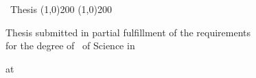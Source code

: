 %
%
%

\makeatletter
\begin{titlepage}

  \vspace*{2cm}
  \center \Large \studylevel\ Thesis
  \center \line(1,0){200}
  \vspace{0.1cm}
  \makethesistitle
  \vspace{0.1cm}
  \center \line(1,0){200}
  \vspace{6.66cm}
  \begin{center}
    \small
    Thesis submitted in partial fulfillment of the requirements\\ for the degree of \studylevel\ of Science in \studydegree
  \end{center}
  \center \small at
  \makeinstitution

\end{titlepage}
\makeatother
